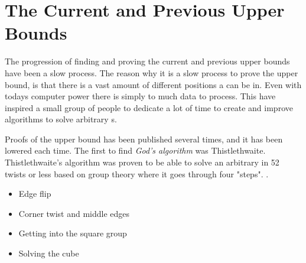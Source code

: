 \section{The Current and Previous Upper Bounds}
The progression of finding and proving the current and previous upper bounds have been a slow process.
The reason why it is a slow process to prove the upper bound, is that there is a vast amount of different positions a \rubik{} can be in. Even with todays computer power there is simply to much data to process. This have inspired a small group of people to dedicate a lot of time to create and improve algorithms to solve arbitrary \rubik{}s.

\begin{comment}

The set solver created by Thomas Rockicki, which was described in the previous section will now be further described.


The set solver has a special way of testing the \rubik{}s. It does not solve them to the unit position $e$, instead it finds a move sequence for a subgroup of the \rubik{} this way it can solve approximately 19.5 billion cubes at a time and not just one. The reason for this is that if you relabel an arbitrary cube, that given cube can be unlabeled to approximately 19.5 billion different cube positions. Recall that there are approximately 19.5 billion positions in the set \m{H} and all these positions are equal to $e$ when relabeled. The same logic applies to any other given position.
\end{comment}

Proofs of the upper bound has been published several times, and it has been lowered each time.
The first to find \textit{God's algorithm} was Thistlethwaite. Thistlethwaite's algorithm was proven to be able to solve an arbitrary \rubik{} in 52 twists or less based on group theory where it goes through four "steps". \cite{jaapthistle}.

\begin{itemize}
\item Edge flip
\item Corner twist and middle edges
\item Getting into the square group
\item Solving the cube
\end{itemize}

